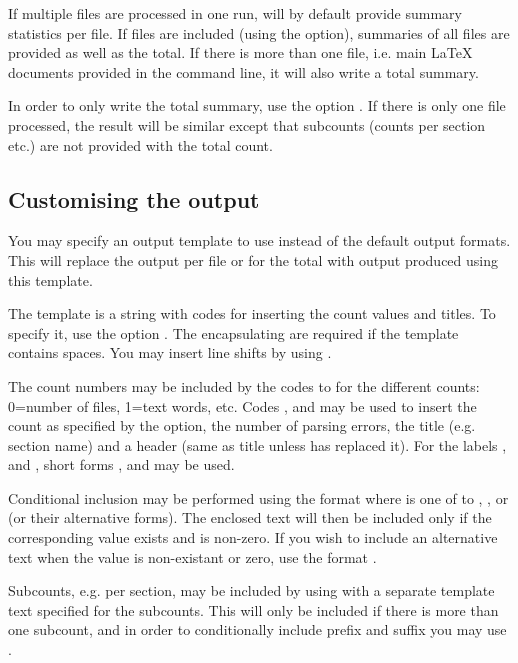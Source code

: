 \documentclass{article}
\begin{document}
If multiple files are processed in one run, \TeXcount{} will by default provide summary statistics per file. If files are included (using the  option), summaries of all files are provided as well as the total. If there is more than one file, i.e. main \LaTeX{} documents provided in the command line, it will also write a total summary.

In order to only write the total summary, use the option . If there is only one file processed, the result will be similar except that subcounts (counts per section etc.) are not provided with the total count.

\subsection{Customising the output}

You may specify an output template to use instead of the default output formats. This will replace the output per file or for the total with output produced using this template.

The template is a string with codes for inserting the count values and titles. To specify it, use the option . The encapsulating  are required if the template contains spaces. You may insert line shifts by using .

The count numbers may be included by the codes  to  for the different counts: 0=number of files, 1=text words, etc. Codes ,  and  may be used to insert the count as specified by the  option, the number of parsing errors, the title (e.g. section name) and a header (same as title unless \TeXcount{} has replaced it). For the labels ,  and , short forms ,  and  may be used.

Conditional inclusion may be performed using the format  where  is one of  to , ,  or  (or their alternative forms). The enclosed text will then be included only if the corresponding value exists and is non-zero. If you wish to include an alternative text when the value is non-existant or zero, use the format .

Subcounts, e.g. per section, may be included by using  with a separate template text specified for the subcounts. This will only be included if there is more than one subcount, and in order to conditionally include prefix and suffix you may use .
\end{document}
